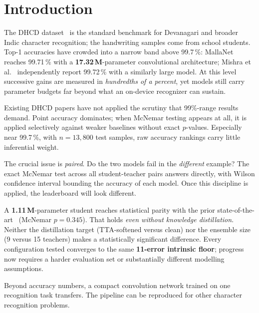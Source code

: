 \section{Introduction}
\label{sec:intro}

The DHCD dataset~\cite{acharya2015dhcd} is the standard benchmark for Devanagari and
broader Indic character recognition; the handwriting samples come from school students.
Top-1 accuracies have crowded into a narrow band above 99.7\,\%: MallaNet~\cite{malla2025}
reaches 99.71\,\% with a \textbf{17.32\,M}-parameter convolutional architecture; Mishra
et al.~\cite{mishra2021} independently report 99.72\,\% with a similarly large model.
At this level successive gains are measured in \emph{hundredths of a percent}, yet
models still carry parameter budgets far beyond what an on-device recognizer can sustain.

Existing DHCD papers have not applied the scrutiny that 99\%-range results demand.
Point accuracy dominates; when McNemar testing appears at all, it is applied selectively
against weaker baselines without exact $p$-values. Especially near 99.7\,\%, with
$n{=}13{,}800$ test samples, raw accuracy rankings carry little inferential weight.

The crucial issue is \emph{paired}. Do the two models fail in the \emph{different} example? The exact McNemar test across all student-teacher pairs answers directly, with Wilson confidence interval bounding the accuracy of each model. Once this discipline is applied, the leaderboard will look different.

A \textbf{1.11\,M}-parameter student reaches statistical parity with the
prior state-of-the-art~\cite{malla2025} (McNemar $p=0.345$). That holds
\emph{even without knowledge distillation}. Neither the distillation target
(TTA-softened versus clean) nor the ensemble size (9 versus 15 teachers)
makes a statistically significant difference. Every configuration tested
converges to the same \textbf{11-error intrinsic floor}; progress now
requires a harder evaluation set or substantially different modelling
assumptions.

Beyond accuracy numbers, a compact convolution network trained on one recognition
task transfers. The pipeline can be reproduced for other character recognition problems.

